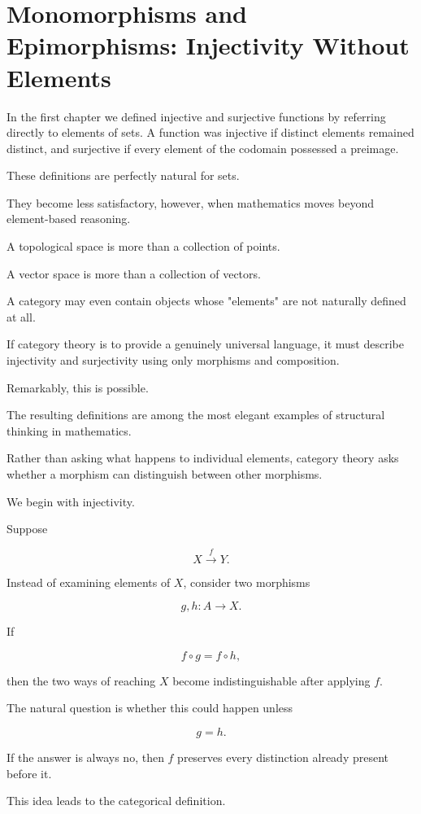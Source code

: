 \documentclass[11pt]{book}
\numberwithin{equation}{chapter}
\theoremstyle{definition}
\theoremstyle{plain}
\theoremstyle{remark}
\begin{document}
\section{Monomorphisms and Epimorphisms: Injectivity Without Elements}

In the first chapter we defined injective and surjective functions by referring directly to elements of sets. A function was injective if distinct elements remained distinct, and surjective if every element of the codomain possessed a preimage.

These definitions are perfectly natural for sets.

They become less satisfactory, however, when mathematics moves beyond element-based reasoning.

A topological space is more than a collection of points.

A vector space is more than a collection of vectors.

A category may even contain objects whose "elements" are not naturally defined at all.

If category theory is to provide a genuinely universal language, it must describe injectivity and surjectivity using only morphisms and composition.

Remarkably, this is possible.

The resulting definitions are among the most elegant examples of structural thinking in mathematics.

Rather than asking what happens to individual elements, category theory asks whether a morphism can distinguish between other morphisms.

We begin with injectivity.

Suppose

\[
X
\overset{f}{\longrightarrow}
Y.
\]

Instead of examining elements of \(X\), consider two morphisms

\[
g,h:A\rightarrow X.
\]

If

\[
f\circ g
=
f\circ h,
\]

then the two ways of reaching \(X\) become indistinguishable after applying \(f\).

The natural question is whether this could happen unless

\[
g=h.
\]

If the answer is always no, then \(f\) preserves every distinction already present before it.

This idea leads to the categorical definition.
\end{document}
